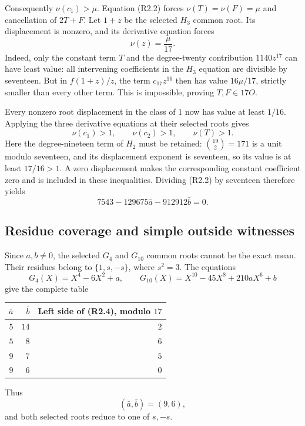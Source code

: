 \documentclass[
  british,
  10pt,
  a4paper,
]{article}
\newcounter{none} %
\begin{document}
Consequently \(\nu(c_1)>\mu\). Equation (R2.2) forces
\(\nu(T)=\nu(F)=\mu\) and cancellation of \(2T+F\). Let \(1+z\) be the
selected \(H_3\) common root. Its displacement is nonzero, and its
derivative equation forces \[
\nu(z)=\frac{\mu}{17}.
\] Indeed, only the constant term \(T\) and the degree-twenty
contribution \(1140z^{17}\) can have least value: all intervening
coefficients in the \(H_3\) equation are divisible by seventeen. But in
\(f(1+z)/z\), the term \(c_{17}z^{16}\) then has value \(16\mu/17\),
strictly smaller than every other term. This is impossible, proving
\(T,F\in17O\).

Every nonzero root displacement in the class of \(1\) now has value at
least \(1/16\). Applying the three derivative equations at their
selected roots gives \[
\nu(c_1)>1,\qquad \nu(c_2)>1,\qquad \nu(T)>1.
\tag{R2.3}
\] Here the degree-nineteen term of \(H_2\) must be retained:
\(\binom{19}{2}=171\) is a unit modulo seventeen, and its displacement
exponent is seventeen, so its value is at least \(17/16>1\). A zero
displacement makes the corresponding constant coefficient zero and is
included in these inequalities. Dividing (R2.2) by seventeen therefore
yields \[
7543-129675\bar a-912912\bar b=0.
\tag{R2.4}
\]

\subsection{Residue coverage and simple outside
witnesses}\label{residue-coverage-and-simple-outside-witnesses}

Since \(a,b\ne0\), the selected \(G_4\) and \(G_{10}\) common roots
cannot be the exact mean. Their residues belong to \(\{1,s,-s\}\), where
\(s^2=3\). The equations \[
G_4(X)=X^4-6X^2+a,
\qquad
G_{10}(X)=X^{10}-45X^8+210aX^6+b
\] give the complete table

{\def\LTcaptype{none} %
\begin{longtable}[]{@{}rrr@{}}
\toprule\noalign{}
\(\bar a\) & \(\bar b\) & Left side of (R2.4), modulo \(17\) \\
\midrule\noalign{}
\endhead
\bottomrule\noalign{}
\endlastfoot
\(5\) & \(14\) & \(2\) \\
\(5\) & \(8\) & \(6\) \\
\(9\) & \(7\) & \(5\) \\
\(9\) & \(6\) & \(0\) \\
\end{longtable}
}

Thus \[
(\bar a,\bar b)=(9,6),
\] and both selected roots reduce to one of \(s,-s\).
\end{document}
